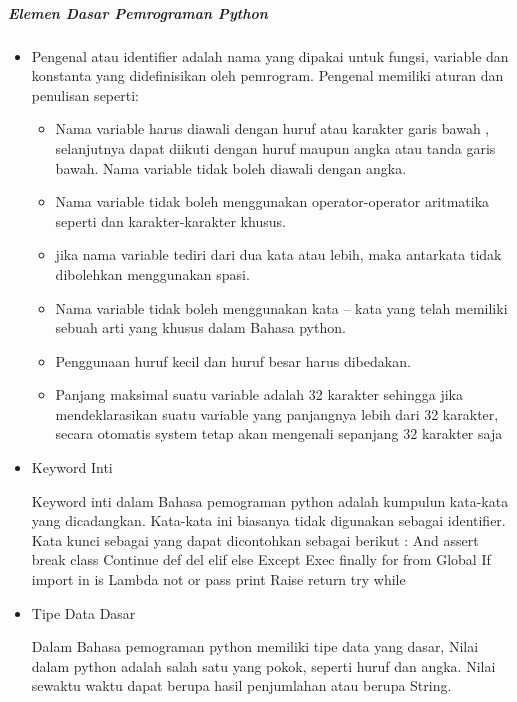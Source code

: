 \documentclass[12pt,a4paper]{article}
\begin{document}
\subparagraph{Elemen Dasar Pemrograman Python}

\begin{itemize}

\item Pengenal atau identifier adalah nama yang dipakai untuk fungsi, variable dan konstanta yang didefinisikan oleh pemrogram. Pengenal memiliki aturan dan penulisan seperti:

\begin{itemize}

\item Nama variable harus diawali dengan huruf atau karakter garis bawah , selanjutnya dapat diikuti dengan huruf maupun angka atau tanda garis bawah. Nama variable tidak boleh diawali dengan angka.
\item Nama variable tidak boleh menggunakan operator-operator aritmatika seperti dan karakter-karakter khusus. 
\item jika nama variable tediri dari dua kata atau lebih, maka antarkata tidak dibolehkan menggunakan spasi.
\item Nama variable tidak boleh menggunakan kata – kata yang telah memiliki sebuah arti yang khusus dalam Bahasa python.
\item Penggunaan huruf kecil dan huruf besar harus dibedakan.
\item Panjang maksimal suatu variable adalah 32 karakter sehingga jika mendeklarasikan suatu variable yang panjangnya lebih dari 32 karakter, secara otomatis system tetap akan mengenali sepanjang 32 karakter saja
\end{itemize}
\item Keyword Inti

Keyword inti dalam Bahasa pemograman python adalah kumpulun kata-kata yang dicadangkan. Kata-kata ini biasanya tidak digunakan sebagai identifier. Kata kunci sebagai yang dapat dicontohkan sebagai berikut :
And  assert  break  class
Continue  def  del  elif  else
Except
Exec  finally  for  from
Global
If  import  in  is
Lambda  not  or  pass  print
Raise  return  try  while

\item Tipe Data Dasar

Dalam Bahasa pemograman python memiliki tipe data yang dasar, Nilai dalam python adalah salah satu yang pokok, seperti huruf dan angka. Nilai sewaktu waktu dapat berupa hasil penjumlahan atau berupa String.


\end{itemize}
\end{document}
